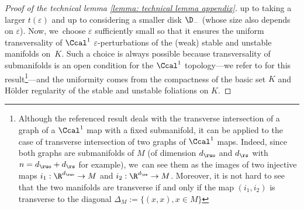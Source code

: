 \begin{appendix}
\begin{proof}[Proof of the technical lemma \ref{lemma: technical lemma appendix}]
up to taking a larger $t (\varepsilon)$ and up to considering a smaller disk $\D_-$ (whose size also depends on $\varepsilon$). Now, we~choose $\varepsilon$ sufficiently small so that it ensures the uniform transversality of $\Ccal^1$ $\varepsilon$-perturbations of the (weak) stable and unstable manifolds on~$K$. Such a choice is always possible because transversality of submanifolds is an open condition for the $\Ccal^1$ topology---we refer to \cite[\S 5.3.3, p.\,88]{laudenbach-book} for this result\footnote{Although the referenced result deals with the transverse intersection of a graph of a $\Ccal^1$ map with a fixed submanifold, it can be applied to the case of transverse intersection of two graphs of $\Ccal^1$ maps. Indeed, since both graphs are submanifolds of $M$ (of dimension $d_{\ruo}$ and $d_\rs$ with $n = d_{\ruo} + d_\rs$ for example), we~can see them as the images of two injective maps $i_1: \R^{d_{\ruo}} \to M$ and $i_2: \R^{d_\rs} \to M$. Moreover, it is not hard to see that the two manifolds are transverse if and only if the map $(i_1,i_2)$ is transverse to the diagonal $\Delta_M:= \{ (x,x), x \in M\}$}---and the uniformity comes from the compactness of the basic set $K$ and  Hölder regularity of the stable and unstable foliations on $K$.


\end{proof}
\end{appendix}
